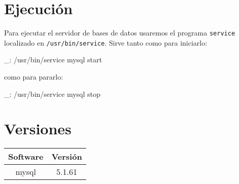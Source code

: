 \section{Ejecución}

Para ejecutar el servidor de bases de datos usaremos el programa \texttt{service} localizado en \texttt{/usr/bin/service}. Sirve tanto como para iniciarlo:

\begin{bashcode}
_: /usr/bin/service mysql start
\end{bashcode}

como para pararlo:
\begin{bashcode}
_: /usr/bin/service mysql stop
\end{bashcode}


\section{Versiones}

\begin{tabular}{|c|c|}
   \hline
   Software & Versión \\ \hline
   mysql & 5.1.61 \\ \hline
\end{tabular}
